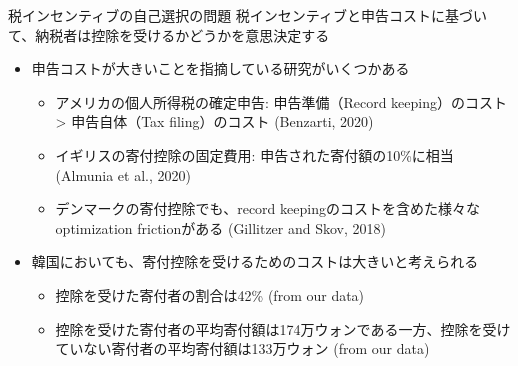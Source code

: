 \documentclass[
  ignorenonframetext,
  aspectratio=169,
]{beamer}
\providecommand{\tightlist}{%
  \setlength{\itemsep}{0pt}\setlength{\parskip}{0pt}}
\begin{document}
\begin{frame}{税インセンティブの自己選択の問題}
\protect\hypertarget{ux7a0eux30a4ux30f3ux30bbux30f3ux30c6ux30a3ux30d6ux306eux81eaux5df1ux9078ux629eux306eux554fux984c}{}
税インセンティブと申告コストに基づいて、納税者は控除を受けるかどうかを意思決定する

\begin{itemize}
\tightlist
\item
  申告コストが大きいことを指摘している研究がいくつかある

  \begin{itemize}
  \tightlist
  \item
    アメリカの個人所得税の確定申告: 申告準備（Record keeping）のコスト \textgreater{} 申告自体（Tax filing）のコスト (Benzarti, 2020)
  \item
    イギリスの寄付控除の固定費用: 申告された寄付額の10\%に相当 (Almunia et al., 2020)
  \item
    デンマークの寄付控除でも、record keepingのコストを含めた様々なoptimization frictionがある (Gillitzer and Skov, 2018)
  \end{itemize}
\item
  韓国においても、寄付控除を受けるためのコストは大きいと考えられる

  \begin{itemize}
  \tightlist
  \item
    控除を受けた寄付者の割合は42\% (from our data)
  \item
    控除を受けた寄付者の平均寄付額は174万ウォンである一方、控除を受けていない寄付者の平均寄付額は133万ウォン (from our data)
  \end{itemize}
\end{itemize}
\end{frame}
\end{document}
